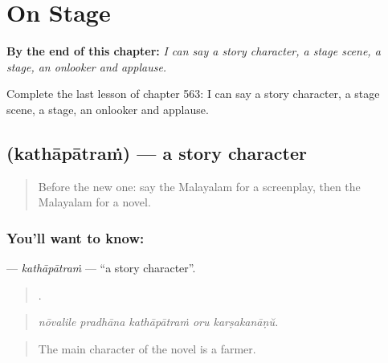 
\chapter{On Stage}
\label{ch:ml-on-stage}

\begin{chapteropening}
\textbf{By the end of this chapter:} \emph{I can say a story character, a stage scene, a stage, an onlooker and applause.}

Complete the last lesson of chapter 563: I can say a story character, a stage scene, a stage, an onlooker and applause.
\end{chapteropening}

\section[\texorpdfstring{\ml{കഥാപാത്രം} (kathāpātraṁ)}{കഥാപാത്രം (kathāpātraṁ)}]{ (kathāpātraṁ) — a story character}

\label{lesson:ML-C563-kathapatram}



\begin{quote}
Before the new one: say the Malayalam for a screenplay, then the Malayalam for a novel.
\end{quote}

\subsection*{You'll want to know: }
\textbf{} — \emph{kathāpātraṁ} — \textquotedblleft{}a story character\textquotedblright{}.

\begin{quote}
    .
\end{quote}

\begin{quote}
\emph{nōvalile pradhāna kathāpātraṁ oru karṣakanāṇŭ.}
\end{quote}

\begin{quote}
The main character of the novel is a farmer.
\end{quote}

